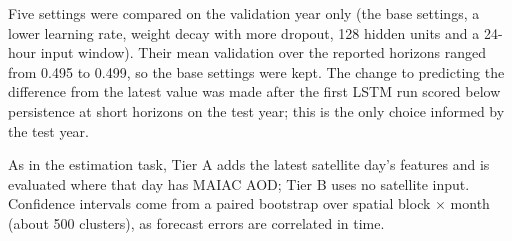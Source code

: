 Five settings were compared on the validation year only (the base settings, a lower learning rate,
weight decay with more dropout, 128 hidden units and a 24-hour input window). Their mean validation
\rsq{} over the reported horizons ranged from 0.495 to 0.499, so the base settings were kept. The
change to predicting the difference from the latest value was made after the first LSTM run scored
below persistence at short horizons on the test year; this is the only choice informed by the test
year.

As in the estimation task, Tier A adds the latest satellite day's features and is evaluated where
that day has MAIAC AOD; Tier B uses no satellite input. Confidence intervals come from a paired
bootstrap over spatial block $\times$ month (about 500 clusters), as forecast errors are correlated
in time.
